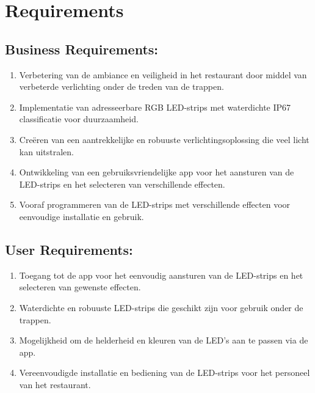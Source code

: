 \section{Requirements}

\subsection{Business Requirements:}
\begin{enumerate}
    \item Verbetering van de ambiance en veiligheid in het restaurant door middel van verbeterde verlichting onder de treden van de trappen.
    \item Implementatie van adresseerbare RGB LED-strips met waterdichte IP67 classificatie voor duurzaamheid.
    \item Creëren van een aantrekkelijke en robuuste verlichtingsoplossing die veel licht kan uitstralen.
    \item Ontwikkeling van een gebruiksvriendelijke app voor het aansturen van de LED-strips en het selecteren van verschillende effecten.
    \item Vooraf programmeren van de LED-strips met verschillende effecten voor eenvoudige installatie en gebruik.
\end{enumerate}

\subsection{User Requirements:}
\begin{enumerate}
    \item Toegang tot de app voor het eenvoudig aansturen van de LED-strips en het selecteren van gewenste effecten.
    \item Waterdichte en robuuste LED-strips die geschikt zijn voor gebruik onder de trappen.
    \item Mogelijkheid om de helderheid en kleuren van de LED's aan te passen via de app.
    \item Vereenvoudigde installatie en bediening van de LED-strips voor het personeel van het restaurant.
\end{enumerate}

